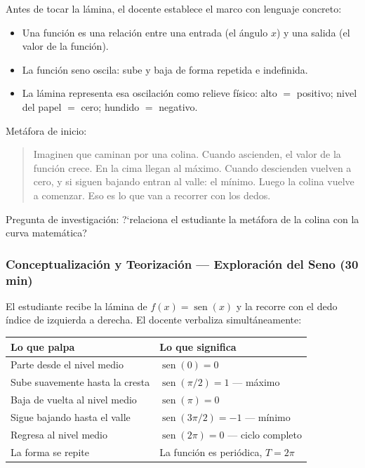 \documentclass[14pt, a4paper]{extarticle}
\begin{document}
Antes de tocar la l\'amina, el docente establece el marco con lenguaje concreto:

\begin{itemize}[itemsep=3pt]
  \item Una funci\'on es una relaci\'on entre una entrada (el \'angulo $x$) y una
        salida (el valor de la funci\'on).
  \item La funci\'on seno oscila: sube y baja de forma repetida e indefinida.
  \item La l\'amina representa esa oscilaci\'on como relieve f\'isico:
        alto $=$ positivo; nivel del papel $=$ cero; hundido $=$ negativo.
\end{itemize}

Met\'afora de inicio:

\begin{quote}
Imaginen que caminan por una colina. Cuando ascienden, el valor de la funci\'on
crece. En la cima llegan al m\'aximo. Cuando descienden vuelven a cero, y si
siguen bajando entran al valle: el m\'inimo. Luego la colina vuelve a comenzar.
Eso es lo que van a recorrer con los dedos.
\end{quote}

Pregunta de investigaci\'on: ?`relaciona el estudiante la met\'afora de la colina
con la curva matem\'atica?

\subsubsection*{Conceptualizaci\'on y Teorizaci\'on ---
Exploraci\'on del Seno \normalfont(30 min)}

El estudiante recibe la l\'amina de $f(x)=\operatorname{sen}(x)$ y la recorre
con el dedo \'indice de izquierda a derecha. El docente verbaliza
simult\'aneamente:

\vspace{4pt}
\begin{tabular}{|p{6.5cm}|p{6.5cm}|}
\hline
Lo que palpa & Lo que significa \\
\hline
Parte desde el nivel medio        & $\operatorname{sen}(0)=0$ \\
\hline
Sube suavemente hasta la cresta   & $\operatorname{sen}(\pi/2)=1$ --- m\'aximo \\
\hline
Baja de vuelta al nivel medio     & $\operatorname{sen}(\pi)=0$ \\
\hline
Sigue bajando hasta el valle      & $\operatorname{sen}(3\pi/2)=-1$ --- m\'inimo \\
\hline
Regresa al nivel medio            & $\operatorname{sen}(2\pi)=0$ --- ciclo completo \\
\hline
La forma se repite                & La funci\'on es peri\'odica, $T=2\pi$ \\
\hline
\end{tabular}
\end{document}
